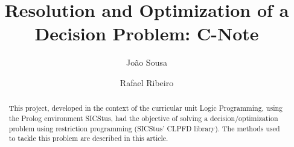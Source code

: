 \documentclass[runningheads]{llncs}
\begin{document}
%
\title{Resolution and Optimization of a Decision Problem: C-Note}
%
%
\author{Jo\~ao Sousa \and Rafael Ribeiro}
%
%
\maketitle              %
%
\begin{abstract}
This project, developed in the context of the curricular unit Logic Programming, using the Prolog environment SICStus, had the objective of solving a decision/optimization problem using restriction programming (SICStus' CLPFD library). The methods used to tackle this problem are described in this article.

\end{abstract}
%
%
%
\end{document}
